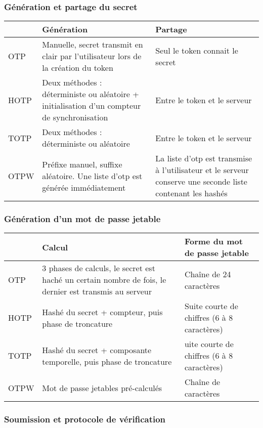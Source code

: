 \subsubsection{Génération et partage du secret}

	\begin{tabular}{| p{3cm} | p{6cm} | p{6cm} |}
		\hline
		& \cellcolor{gray} Génération & \cellcolor{gray} Partage \\
		\hline
		OTP & Manuelle, secret transmit en clair par l'utilisateur lors de la
		création du token & Seul le token connait le secret \\
		\hline
		HOTP & Deux méthodes : déterministe ou aléatoire + initialisation d'un
		compteur de synchronisation & Entre le token et le serveur \\
		\hline
		TOTP & Deux méthodes : déterministe ou aléatoire & Entre le token et
		le serveur \\
		\hline
		OTPW & Préfixe manuel, suffixe aléatoire. Une liste d'otp est générée
		immédiatement & La liste d'otp est transmise à l'utilisateur et le
		serveur conserve une seconde liste contenant les hashés \\
		\hline
	\end{tabular}

\subsubsection{Génération d'un mot de passe jetable}

	\begin{tabular}{| p{3cm} | p{6cm} | p{6cm}}
		\hline
		& \cellcolor{gray} Calcul & \cellcolor{gray} Forme du mot de passe
		jetable \\
		\hline
		OTP & 3 phases de calculs, le secret est haché un certain nombre de
		fois, le dernier est transmis au serveur & Chaîne de 24 caractères \\
		\hline
		HOTP & Hashé du secret + compteur, puis phase de troncature & Suite
		courte de chiffres (6 à 8 caractères) \\
		\hline
		TOTP & Hashé du secret + composante temporelle, puis phase de
		troncature & uite courte de chiffres (6 à 8 caractères) \\
		\hline
		OTPW & Mot de passe jetables pré-calculés & Chaîne de caractères \\
		\hline
	\end{tabular}

\subsubsection{Soumission et protocole de vérification}


